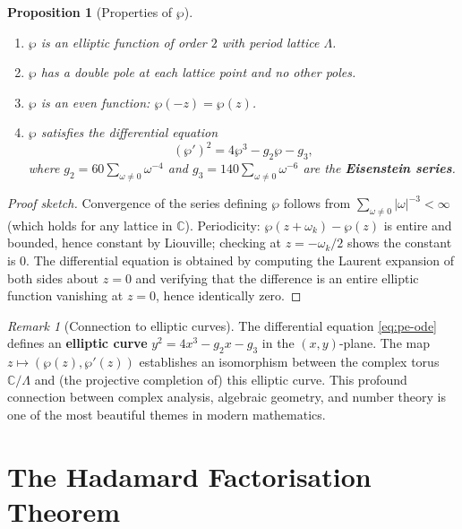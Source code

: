 \documentclass[12pt,a4paper,openany]{book}
\theoremstyle{definition}
\theoremstyle{plain}
\newtheorem{proposition}[definition]{Proposition}
\theoremstyle{remark}
\newtheorem{remark}[definition]{Remark}
\newcommand{\C}{\mathbb{C}}
\newcommand{\abs}[1]{\left|#1\right|}
\begin{document}
\begin{proposition}[Properties of $\wp$]\label{prop:pe-properties}
\begin{enumerate}[label=(\roman*)]
  \item $\wp$ is an elliptic function of order $2$ with period lattice $\Lambda$.
  \item $\wp$ has a double pole at each lattice point and no other poles.
  \item $\wp$ is an even function: $\wp(-z) = \wp(z)$.
  \item $\wp$ satisfies the differential equation
    \begin{equation}\label{eq:pe-ode}
      (\wp')^2 = 4\wp^3 - g_2 \wp - g_3,
    \end{equation}
    where $g_2 = 60\sum_{\omega \neq 0}\omega^{-4}$ and
    $g_3 = 140\sum_{\omega \neq 0}\omega^{-6}$ are the
    \textbf{Eisenstein series}.
\end{enumerate}
\end{proposition}

\begin{proof}[Proof sketch]
Convergence of the series defining $\wp$ follows from
$\sum_{\omega \neq 0}\abs{\omega}^{-3} < \infty$ (which holds for
any lattice in $\C$). Periodicity: $\wp(z+\omega_k) - \wp(z)$ is
entire and bounded, hence constant by Liouville; checking at $z = -\omega_k/2$
shows the constant is $0$. The differential equation is obtained by
computing the Laurent expansion of both sides about $z = 0$ and verifying
that the difference is an entire elliptic function vanishing at $z=0$,
hence identically zero.
\end{proof}

\begin{remark}[Connection to elliptic curves]\label{rem:elliptic-curves}
The differential equation \eqref{eq:pe-ode} defines an \textbf{elliptic curve}
$y^2 = 4x^3 - g_2 x - g_3$ in the $(x,y)$-plane. The map
$z \mapsto (\wp(z), \wp'(z))$ establishes an isomorphism between
the complex torus $\C/\Lambda$ and (the projective completion of)
this elliptic curve. This profound connection between complex analysis,
algebraic geometry, and number theory is one of the most beautiful
themes in modern mathematics.
\end{remark}


\section{The Hadamard Factorisation Theorem}\label{sec:hadamard}
\end{document}
